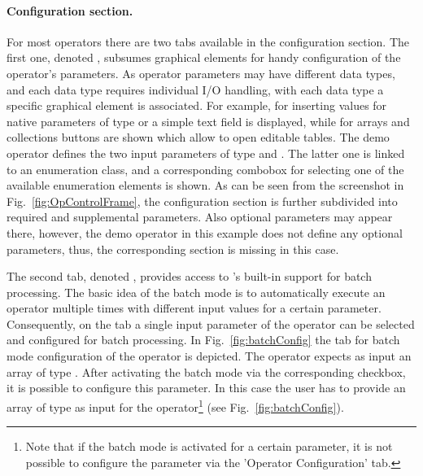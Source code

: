 \vspace*{-0.25cm}
\paragraph{Configuration section.} For most operators there are two tabs
available in the configuration section. The first one, denoted , subsumes graphical elements for handy configuration of the
operator's parameters. As operator parameters may have different data types, and
each data type requires individual I/O handling, with each data type a specific
graphical element is associated. 
For example, for inserting values for native parameters of type  or
 a simple text field is displayed, while for arrays and
collections buttons are shown which allow to open editable tables. 
The demo operator  defines the two input parameters
 of type  and .
The latter one is linked to an enumeration class, and a corresponding
combobox for selecting one of the available enumeration elements is shown.
As can be seen from the screenshot in Fig.~\ref{fig:OpControlFrame}, the
configuration section is further subdivided into required and
supplemental parameters. Also optional parameters may appear there, however, the
demo operator in this example does not define any optional parameters, thus, the
corresponding section is missing in this case.

The second tab, denoted , provides access to \alida's built-in support for batch
processing. The basic idea of the batch mode is to automatically execute an
operator multiple times with different input values for a certain parameter.
Consequently, on the tab a single input parameter of the operator can be
selected and configured for batch processing.
In Fig.~\ref{fig:batchConfig} the tab for batch mode configuration of the
operator  is depicted. The operator expects as input an
array of type . After activating the batch mode via the
corresponding checkbox, it is possible to configure this parameter. In this case
the user has to provide an array of type  as input for the
operator\footnote{Note that if the batch mode is activated for a certain
parameter, it is not possible to configure the parameter via the 'Operator
Configuration' tab.} (see Fig.~\ref{fig:batchConfig}).

